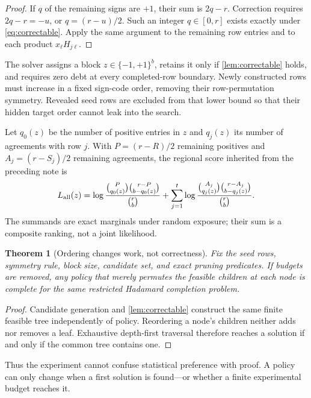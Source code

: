 \documentclass[10pt,twoside]{article}
\theoremstyle{noteplain}
\newtheorem{theorem}{Theorem}
\theoremstyle{definition}
\begin{document}
\begin{proof}
If $q$ of the remaining signs are $+1$, their sum is $2q-r$.  Correction requires $2q-r=-u$, or $q=(r-u)/2$.  Such an integer $q\in[0,r]$ exists exactly under \eqref{eq:correctable}.  Apply the same argument to the remaining row entries and to each product $x_\ell H_{j\ell}$.
\end{proof}

The solver assigns a block $z\in\{-1,+1\}^{b}$, retains it only if \cref{lem:correctable} holds, and requires zero debt at every completed-row boundary.  Newly constructed rows must increase in a fixed sign-code order, removing their row-permutation symmetry.  Revealed seed rows are excluded from that lower bound so that their hidden target order cannot leak into the search.

Let $q_0(z)$ be the number of positive entries in $z$ and $q_j(z)$ its number of agreements with row $j$.  With $P=(r-R)/2$ remaining positives and $A_j=(r-S_j)/2$ remaining agreements, the regional score inherited from the preceding note is
\begin{equation}\label{eq:score}
L_{\rm all}(z)=
\log\frac{\binom{P}{q_0(z)}\binom{r-P}{b-q_0(z)}}{\binom rb}
+\sum_{j=1}^{t}
\log\frac{\binom{A_j}{q_j(z)}\binom{r-A_j}{b-q_j(z)}}{\binom rb}.
\end{equation}
The summands are exact marginals under random exposure; their sum is a composite ranking, not a joint likelihood.

\begin{theorem}[Ordering changes work, not correctness]\label{thm:complete}
Fix the seed rows, symmetry rule, block size, candidate set, and exact pruning predicates.  If budgets are removed, any policy that merely permutes the feasible children at each node is complete for the same restricted Hadamard completion problem.
\end{theorem}

\begin{proof}
Candidate generation and \cref{lem:correctable} construct the same finite feasible tree independently of policy.  Reordering a node's children neither adds nor removes a leaf.  Exhaustive depth-first traversal therefore reaches a solution if and only if the common tree contains one.
\end{proof}

Thus the experiment cannot confuse statistical preference with proof.  A policy can only change when a first solution is found---or whether a finite experimental budget reaches it.
\end{document}
